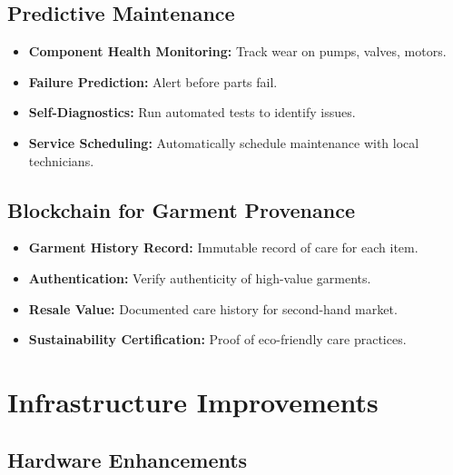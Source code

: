 \subsection{Predictive Maintenance}
\begin{itemize}
    \item \textbf{Component Health Monitoring:} Track wear on pumps, valves, motors.
    \item \textbf{Failure Prediction:} Alert before parts fail.
    \item \textbf{Self-Diagnostics:} Run automated tests to identify issues.
    \item \textbf{Service Scheduling:} Automatically schedule maintenance with local technicians.
\end{itemize}

\subsection{Blockchain for Garment Provenance}
\begin{itemize}
    \item \textbf{Garment History Record:} Immutable record of care for each item.
    \item \textbf{Authentication:} Verify authenticity of high-value garments.
    \item \textbf{Resale Value:} Documented care history for second-hand market.
    \item \textbf{Sustainability Certification:} Proof of eco-friendly care practices.
\end{itemize}

\section{Infrastructure Improvements}

\subsection{Hardware Enhancements}

